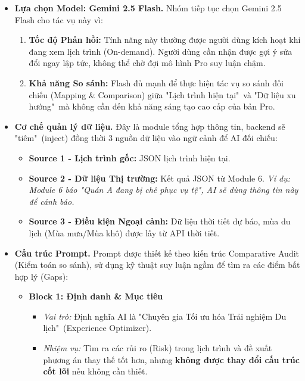 \begin{itemize}
    \item \textbf{Lựa chọn Model: Gemini 2.5 Flash.} Nhóm tiếp tục chọn Gemini 2.5 Flash cho tác vụ này vì:
    \begin{enumerate}[label=\arabic*., leftmargin=*]
        \item \textbf{Tốc độ Phản hồi:} Tính năng này thường được người dùng kích hoạt khi đang xem lịch trình (On-demand). Người dùng cần nhận được gợi ý sửa đổi ngay lập tức, không thể chờ đợi mô hình Pro suy luận chậm.
        
        \item \textbf{Khả năng So sánh:} Flash đủ mạnh để thực hiện tác vụ so sánh đối chiếu (Mapping \& Comparison) giữa "Lịch trình hiện tại"\ và "Dữ liệu xu hướng"\ mà không cần đến khả năng sáng tạo cao cấp của bản Pro.
    \end{enumerate}

    \item \textbf{Cơ chế quản lý dữ liệu.} Đây là module tổng hợp thông tin, backend sẽ "tiêm"\ (inject) đồng thời 3 nguồn dữ liệu vào ngữ cảnh để AI đối chiếu:
    \begin{itemize}
        \item \textbf{Source 1 - Lịch trình gốc:} JSON lịch trình hiện tại.
        \item \textbf{Source 2 - Dữ liệu Thị trường:} Kết quả JSON từ Module 6. \textit{Ví dụ: Module 6 báo "Quán A đang bị chê phục vụ tệ", AI sẽ dùng thông tin này để cảnh báo.}
        \item \textbf{Source 3 - Điều kiện Ngoại cảnh:} Dữ liệu thời tiết dự báo, mùa du lịch (Mùa mưa/Mùa khô) được lấy từ API thời tiết.
    \end{itemize}

    \item \textbf{Cấu trúc Prompt.} Prompt được thiết kế theo kiến trúc Comparative Audit (Kiểm toán so sánh), sử dụng kỹ thuật suy luận ngầm để tìm ra các điểm bất hợp lý (Gaps):
    \begin{itemize}
        \item \textbf{Block 1: Định danh \& Mục tiêu}
        \begin{itemize}
            \item \textit{Vai trò:} Định nghĩa AI là "Chuyên gia Tối ưu hóa Trải nghiệm Du lịch"\ (Experience Optimizer).
            \item \textit{Nhiệm vụ:} Tìm ra các rủi ro (Risk) trong lịch trình và đề xuất phương án thay thế tốt hơn, nhưng \textbf{không được thay đổi cấu trúc cốt lõi} nếu không cần thiết.
        \end{itemize}
        

\end{itemize}
\end{itemize}

